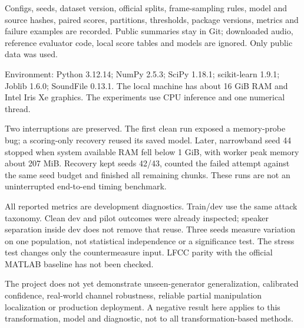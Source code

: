 \documentclass[10pt,a4paper]{article}
\begin{document}
\par

Configs, seeds, dataset version, official splits, frame-sampling rules, model and source hashes, paired scores, partitions, thresholds, package versions, metrics and failure examples are recorded. Public summaries stay in Git; downloaded audio, reference evaluator code, local score tables and models are ignored. Only public data was used.\par

Environment: Python 3.12.14; NumPy 2.5.3; SciPy 1.18.1; scikit-learn 1.9.1; Joblib 1.6.0; SoundFile 0.13.1. The local machine has about 16 GiB RAM and Intel Iris Xe graphics. The experiments use CPU inference and one numerical thread.\par

Two interruptions are preserved. The first clean run exposed a memory-probe bug; a scoring-only recovery reused its saved model. Later, narrowband seed 44 stopped when system available RAM fell below 1 GiB, with worker peak memory about 207 MiB. Recovery kept seeds 42/43, counted the failed attempt against the same seed budget and finished all remaining chunks. These runs are not an uninterrupted end-to-end timing benchmark.\par

\par

All reported metrics are development diagnostics. Train/dev use the same attack taxonomy. Clean dev and pilot outcomes were already inspected; speaker separation inside dev does not remove that reuse. Three seeds measure variation on one population, not statistical independence or a significance test. The stress test changes only the countermeasure input. LFCC parity with the official MATLAB baseline has not been checked.\par

The project does not yet demonstrate unseen-generator generalization, calibrated confidence, real-world channel robustness, reliable partial manipulation localization or production deployment. A negative result here applies to this transformation, model and diagnostic, not to all transformation-based methods.\par

\par
\end{document}
